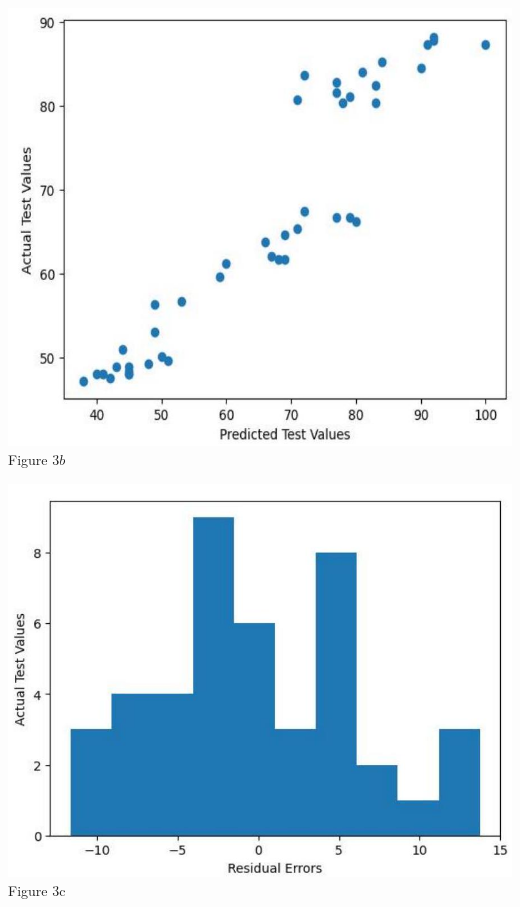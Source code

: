 \documentclass{article}
\begin{document}
\begin{center}
\includegraphics[scale=0.25]{2023_08_04_7b2b5ae1fb9d756e7758g-6}
\\Figure $3 b$
\end{center}



\begin{center}
\includegraphics[scale=0.25]{2023_08_04_7b2b5ae1fb9d756e7758g-6(1)}
\\ Figure 3c
\end{center}
\end{document}

